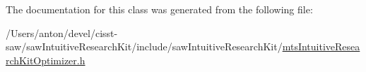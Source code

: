 The documentation for this class was generated from the following file\+:\begin{DoxyCompactItemize}
\item 
/\+Users/anton/devel/cisst-\/saw/saw\+Intuitive\+Research\+Kit/include/saw\+Intuitive\+Research\+Kit/\hyperlink{mts_intuitive_research_kit_optimizer_8h}{mts\+Intuitive\+Research\+Kit\+Optimizer.\+h}\end{DoxyCompactItemize}
